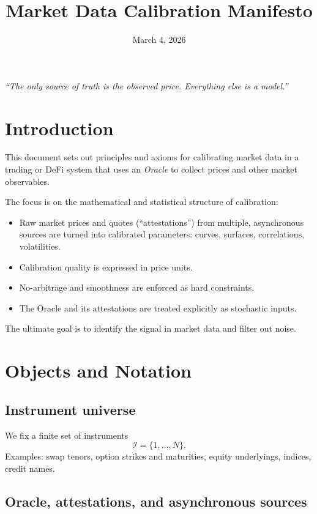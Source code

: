 \documentclass[11pt,a4paper]{article}
\title{Market Data Calibration Manifesto}
\date{March 4, 2026}
\begin{document}
\maketitle

\begin{center}
\textit{``The only source of truth is the observed price. Everything else is a model.''}
\end{center}

\section{Introduction}

This document sets out principles and axioms for calibrating market data in a trading or DeFi system that uses an \textit{Oracle} to collect prices and other market observables.

The focus is on the mathematical and statistical structure of calibration:
\begin{itemize}
    \item Raw market prices and quotes (``attestations'') from multiple, asynchronous sources are turned into calibrated parameters: curves, surfaces, correlations, volatilities.
    \item Calibration quality is expressed in price units.
    \item No-arbitrage and smoothness are enforced as hard constraints.
    \item The Oracle and its attestations are treated explicitly as stochastic inputs.
\end{itemize}

The ultimate goal is to identify the signal in market data and filter out noise.

\section{Objects and Notation}

\subsection{Instrument universe}

We fix a finite set of instruments
\[
    \mathcal{I} = \{1, \ldots, N\}.
\]
Examples: swap tenors, option strikes and maturities, equity underlyings, indices, credit names.

\subsection{Oracle, attestations, and asynchronous sources}
\end{document}
